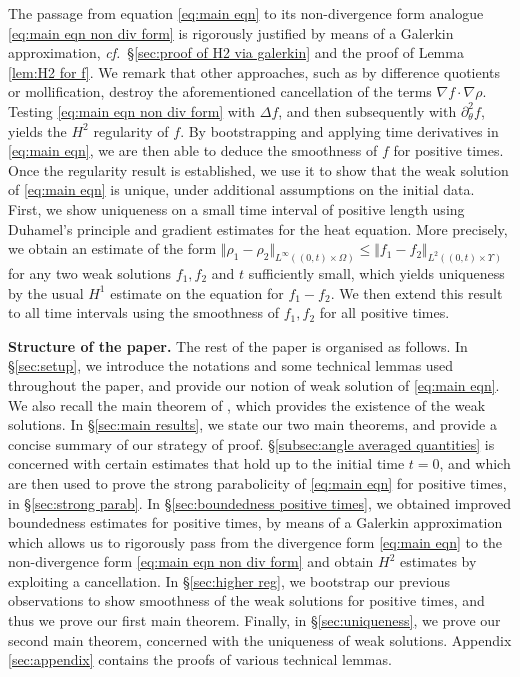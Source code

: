 \documentclass[11pt,a4paper,reqno]{amsart}
\theoremstyle{remark}
\theoremstyle{definition}
\numberwithin{equation}{section}
\begin{document}
The passage from equation \eqref{eq:main eqn} to its non-divergence form analogue \eqref{eq:main eqn non div form} is rigorously justified by means of a Galerkin approximation, \textit{cf.}~\S \ref{sec:proof of H2 via galerkin} and the proof of Lemma \ref{lem:H2 for f}. We remark that other approaches, such as by difference quotients or mollification, destroy the aforementioned cancellation of the terms $\nabla f  \cdot  \nabla \rho$. Testing \eqref{eq:main eqn non div form} with $\Delta f$, and then subsequently with $\partial^2_\theta f$, yields the $H^2$ regularity of $f$. By bootstrapping and applying time derivatives in \eqref{eq:main eqn}, we are then able to deduce the smoothness of $f$ for positive times. Once the regularity result is established, we use it to show that the weak solution of \eqref{eq:main eqn} is unique, under additional assumptions on the initial data. First, we show uniqueness on a small time interval of positive length using Duhamel's principle and gradient estimates for the heat equation. More precisely, we obtain an estimate of the form $\Vert \rho_1 - \rho_2 \Vert_{L^\infty((0,t)\times\Omega)} \leq \Vert f_1 - f_2 \Vert_{L^2((0,t)\times\Upsilon)}$ for any two weak solutions $f_1,f_2$ and $t$ sufficiently small, which yields uniqueness by the usual $H^1$ estimate on the equation for $f_1-f_2$. We then extend this result to all time intervals using the smoothness of $f_1,f_2$ for all positive times. 


\noindent\textbf{Structure of the paper.}
The rest of the paper is organised as follows. In \S \ref{sec:setup}, we introduce the notations and some technical lemmas used throughout the paper, and provide our notion of weak solution of \eqref{eq:main eqn}. We also recall the main theorem of \cite{Martin}, which provides the existence of the weak solutions. In \S \ref{sec:main results}, we state our two main theorems, and provide a concise summary of our strategy of proof. \S \ref{subsec:angle averaged quantities} is concerned with certain estimates that hold up to the initial time $t=0$, and which are then used to prove the strong parabolicity of \eqref{eq:main eqn} for positive times, in \S \ref{sec:strong parab}. In \S \ref{sec:boundedness positive times}, we obtained improved boundedness estimates for positive times, by means of a Galerkin approximation which allows us to rigorously pass from the divergence form \eqref{eq:main eqn} to the non-divergence form \eqref{eq:main eqn non div form} and obtain $H^2$ estimates by exploiting a cancellation. In \S \ref{sec:higher reg}, we bootstrap our previous observations to show smoothness of the weak solutions for positive times, and thus we prove our first main theorem. Finally, in \S \ref{sec:uniqueness}, we prove our second main theorem, concerned with the uniqueness of weak solutions. Appendix \ref{sec:appendix} contains the proofs of various technical lemmas. 
\end{document}
